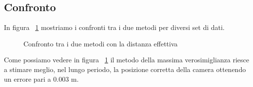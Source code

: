 \subsection{Confronto}
In figura  ~\ref{fig:confronto} mostriamo i confronti tra i due metodi per diversi set di dati.
\begin{figure}
  \centering
  \caption{Confronto tra i due metodi con la distanza effettiva}
  \label{fig:confronto}
\end{figure}
Come possiamo vedere in figura ~\ref{fig:confronto} il metodo della massima verosimiglianza riesce a stimare meglio, nel lungo periodo, la posizione corretta della camera ottenendo un errore pari a 0.003 m. 
